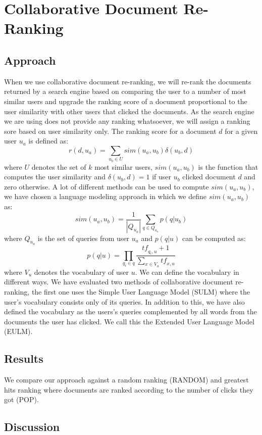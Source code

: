 \documentclass[12pt]{amsart}
\begin{document}
\section{Collaborative Document Re-Ranking}
\subsection{Approach}
When we use collaborative document re-ranking, we will re-rank the documents returned by a search engine based on comparing the user to a number of most similar users and upgrade the ranking score of a document proportional to the user similarity with other users that clicked the documents. As the search engine we are using does not provide any ranking whatsoever, we will assign a ranking sore based on user similarity only. The ranking score for a document $d$ for a given user $u_a$ is defined as: 
$$r(d, u_a) = \sum\limits_{u_b \in U}\textit{sim}(u_a, u_b)\delta(u_b, d)$$
where $U$ denotes the set of $k$ most similar users, $\textit{sim}(u_a, u_b)$ is the function that computes the user similarity and $\delta(u_b, d) = 1$ if user $u_b$ clicked document $d$ and zero otherwise. A lot of different methods can be used to compute $\textit{sim}(u_a, u_b)$, we have chosen a language modeling approach in which we define $\textit{sim}(u_a, u_b)$ as:
$$ \textit{sim}(u_a, u_b) = \frac{1}{|Q_{u_a}|}\sum\limits_{q \in Q_{u_a}} p(q|u_b)$$
where $Q_{u_a}$ is the set of queries from user $u_a$ and $p(q|u)$ can be computed as:
$$p(q|u) = \prod\limits_{q_i \in q} \frac{\textit{tf}_{q_i, u}+1}{\sum\limits_{x \in V_u} \textit{tf}_{x, u}}$$
where $V_u$ denotes the vocabulary of user $u$. We can define the vocabulary in different ways. We have evaluated two methods of collaborative document re-ranking, the first one uses the Simple User Language Model (SULM) where the user's vocabulary consists only of its queries. In addition to this, we have also defined the vocabulary as the users's queries complemented by all words from the documents the user has clicked. We call this the Extended User Language Model (EULM).
\subsection{Results}
We compare our approach against a random ranking (RANDOM) and greatest hits ranking where documents are ranked according to the number of clicks they got (POP).
\subsection{Discussion}
\end{document}
